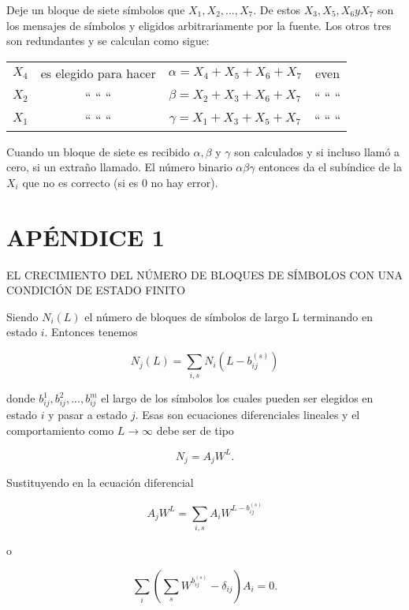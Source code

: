 
Deje un bloque de siete s\'imbolos que $X_{1}, X_{2},...,X_{7}$. De estos 
$X_{3}, X_{5}, X_{6} y X_{7}$ son los mensajes de símbolos y eligidos 
arbitrariamente por la fuente. Los otros tres son redundantes y se calculan como sigue:

\begin{tabular}{c c c c}
$X_{4}$ & es elegido para hacer & $\alpha=X_{4}+X_{5}+X_{6}+X_{7}$ & even \\
$X_{2}$ & `` `` `` & $\beta=X_{2}+X_{3}+X_{6}+X_{7}$ & `` `` `` \\
$X_{1}$ & `` `` ``& $\gamma=X_{1}+X_{3}+X_{5}+X_{7}$ & `` `` ``
\end{tabular}

Cuando un bloque de siete es recibido $\alpha, \beta$ y $\gamma$ son calculados y 
si incluso llam\'o a cero, si un extra\~no llamado. El n\'umero binario $\alpha \beta \gamma$ 
entonces da el sub\'indice de la $X_{i}$ que no es correcto (si es 0 no hay error).

\section{AP\'ENDICE 1}
EL CRECIMIENTO DEL N\'UMERO DE BLOQUES DE S\'IMBOLOS CON UNA CONDICI\'ON DE ESTADO FINITO

Siendo $N_{i}(L)$ el n\'umero de bloques de s\'imbolos de largo L terminando en estado $i$. 
Entonces tenemos

\begin{equation}
N_{j}(L)=\sum_{i,s} N_{i}(L-b_{ij}^{(s)})
\end{equation}

donde $b_{ij}^{1},b_{ij}^{2},...,b_{ij}^{m}$ el largo de los s\'imbolos los cuales pueden 
ser elegidos en estado $i$ y pasar a estado $j$. Esas son ecuaciones diferenciales lineales 
y el comportamiento como $L\rightarrow \infty $ debe ser de tipo

\begin{equation}
N_{j}=A_{j}W^{L}.
\end{equation}

Sustituyendo en la ecuaci\'on diferencial 

\begin{equation}
A_{j}W^{L} = \sum_{i,s}A_{i}W^{L-b_{ij}^{(s)}}
\end{equation}

o

\begin{equation}
\sum_{i}(\sum_{s}W^{b_{ij}^{(s)}}-\delta_{ij})A_{i}=0.
\end{equation}

